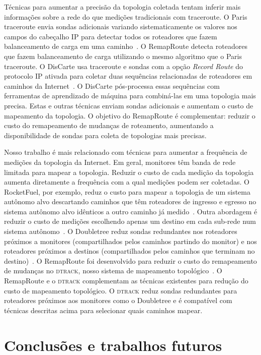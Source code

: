 \documentclass{JBCS}
\newcommand{\dtrack}{\textsc{dtrack}}
\newcommand{\rmprt}{{Re\-map\-Rou\-te}}
\begin{document}
Técnicas para aumentar a precisão da topologia coletada tentam inferir
mais informações sobre a rede do que medições tradicionais com
traceroute.  O Paris traceroute envia sondas adicionais variando
sistematicamente os valores nos campos do cabeçalho IP para detectar
todos os roteadores que fazem balanceamento de carga em uma
caminho~\cite{augustin07, veitch09balancer}.  O \rmprt{} detecta
roteadores que fazem balanceamento de carga utilizando o mesmo algoritmo
que o Paris traceroute.  O DisCarte usa traceroute e sondas com a opção
\emph{Record Route} do protocolo IP ativada para coletar duas sequências
relacionadas de roteadores em caminhos da
Internet~\cite{sherwood08discarte}.  O DisCarte pós-processa essas
sequências com ferramentas de aprendizado de máquina para combiná-las em
uma topologia mais precisa.  Estas e outras técnicas enviam sondas
adicionais e aumentam o custo de mapeamento da topologia.  O objetivo do
RemapRoute é complementar: reduzir o custo do remapeamento de mudanças
de roteamento, aumentando a disponibilidade de sondas para coleta de
topologias mais precisas.  

Nosso trabalho é mais relacionado com técnicas para aumentar a
frequência de medições da topologia da Internet.  Em geral, monitores
têm banda de rede limitada para mapear a topologia.  Reduzir o custo de
cada medição da topologia aumenta diretamente a frequência com a qual
medições podem ser coletadas.  O RocketFuel, por exemplo, reduz o custo
para mapear a topologia de um sistema autônomo alvo descartando caminhos
que têm roteadores de ingresso e egresso no sistema autônomo alvo
idênticos a outro caminho já medido~\cite{spring02rocketfuel}.  Outra
abordagem é reduzir o custo de medições escolhendo apenas um destino em
cada sub-rede num sistema autônomo~\cite{beverly10hifreq}.  O Doubletree
reduz sondas redundantes nos roteadores próximos a monitores
(compartilhados pelos caminhos partindo do monitor) e nos roteadores
próximos a destinos (compartilhados pelos caminhos que terminam no
destino)~\cite{donnet05topology}.  O \rmprt{} foi desenvolvido para
reduzir o custo do remapeamento de mudanças no \dtrack{}, nosso sistema
de mapeamento topológico~\cite{cunha11dtrack}.  O \rmprt{} e o \dtrack{}
complementam as técnicas existentes para redução do custo de mapeamento
topológico.  O \dtrack{} reduz sondas redundantes para roteadores
próximos aos monitores como o Doubletree e é compatível com técnicas
descritas acima para selecionar quais caminhos mapear.

\section{Conclusões e trabalhos futuros}
\label{sec:conc}
\end{document}
